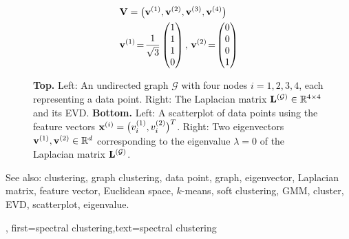 {{\begin{figure}[H]
\begin{center}
\begin{minipage}{0.4\textwidth}
				\end{minipage} 
    		\begin{minipage}{0.4\textwidth}
										\begin{align}
											& \mathbf{V} = \big( {\bf v}^{(1)},{\bf v}^{(2)},{\bf v}^{(3)},{\bf v}^{(4)} \big) \nonumber \\
											&	\mathbf{v}^{(1)}\!=\!\frac{1}{\sqrt{3}} \begin{pmatrix} 1 \\ 1 \\ 1 \\ 0 \end{pmatrix}, \,
												\mathbf{v}^{(2)}\!=\!\begin{pmatrix} 0 \\ 0 \\ 0 \\ 1 \end{pmatrix} \nonumber 
												\end{align}
				\end{minipage} 
				\caption{\label{fig_lap_mtx_specclustering_dict} {\bf Top.} Left: An undirected graph 
					$\mathcal{G}$ with four nodes $i=1,2,3,4$, each representing a data point. Right: The Laplacian matrix 
					${\bf L}^{(\mathcal{G})}  \in \mathbb{R}^{4 \times 4}$ and its EVD. 
					{\bf Bottom.} Left: A scatterplot of data points using the feature vectors 
					${\bf x}^{(i)} = \big( v^{(1)}_{i},v^{(2)}_{i} \big)^{T}$. 
					Right: Two eigenvectors ${\bf v}^{(1)},{\bf v}^{(2)} \in \mathbb{R}^{d}$ 
					corresponding to the eigenvalue $\lambda=0$ of the Laplacian matrix ${\bf L}^{(\mathcal{G})}$. 
					} 
			\end{center}
		\end{figure}
		See also: clustering, graph clustering, data point, graph, eigenvector, Laplacian matrix, feature vector, Euclidean space, $k$-means, soft clustering, GMM, cluster, EVD, scatterplot, eigenvalue.
	\newpage}, 
	first={spectral clustering},text={spectral clustering} 
}


